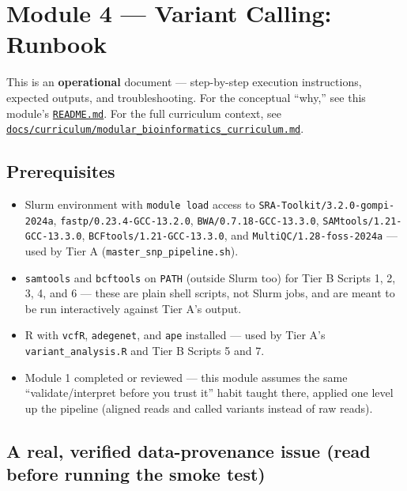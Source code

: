 \documentclass[
]{article}
\author{}
\date{\vspace{-2.5em}}
\providecommand{\tightlist}{%
  \setlength{\itemsep}{0pt}\setlength{\parskip}{0pt}}
\begin{document}
\section{Module 4 --- Variant Calling:
Runbook}\label{module-4-variant-calling-runbook}

This is an \textbf{operational} document --- step-by-step execution
instructions, expected outputs, and troubleshooting. For the conceptual
``why,'' see this module's \href{README.md}{\texttt{README.md}}. For the
full curriculum context, see
\href{../../docs/curriculum/modular_bioinformatics_curriculum.md}{\texttt{docs/curriculum/modular\_bioinformatics\_curriculum.md}}.

\subsection{Prerequisites}\label{prerequisites}

\begin{itemize}
\tightlist
\item
  Slurm environment with \texttt{module\ load} access to
  \texttt{SRA-Toolkit/3.2.0-gompi-2024a},
  \texttt{fastp/0.23.4-GCC-13.2.0}, \texttt{BWA/0.7.18-GCC-13.3.0},
  \texttt{SAMtools/1.21-GCC-13.3.0}, \texttt{BCFtools/1.21-GCC-13.3.0},
  and \texttt{MultiQC/1.28-foss-2024a} --- used by Tier A
  (\texttt{master\_snp\_pipeline.sh}).
\item
  \texttt{samtools} and \texttt{bcftools} on \texttt{PATH} (outside
  Slurm too) for Tier B Scripts 1, 2, 3, 4, and 6 --- these are plain
  shell scripts, not Slurm jobs, and are meant to be run interactively
  against Tier A's output.
\item
  R with \texttt{vcfR}, \texttt{adegenet}, and \texttt{ape} installed
  --- used by Tier A's \texttt{variant\_analysis.R} and Tier B Scripts 5
  and 7.
\item
  Module 1 completed or reviewed --- this module assumes the same
  ``validate/interpret before you trust it'' habit taught there, applied
  one level up the pipeline (aligned reads and called variants instead
  of raw reads).
\end{itemize}

\subsection{A real, verified data-provenance issue (read before running
the smoke
test)}\label{a-real-verified-data-provenance-issue-read-before-running-the-smoke-test}
\end{document}

